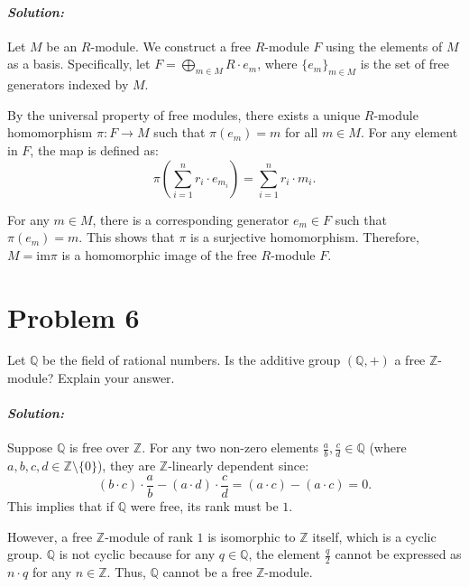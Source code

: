 \documentclass[12pt, a4paper]{article}
\newenvironment{solution}
  {\paragraph{\textit{Solution:}}\par\medskip}
  {\vspace{0.1cm}}
\begin{document}
\begin{solution}
    Let $M$ be an $R$-module. We construct a free $R$-module $F$ using the elements of $M$ as a basis. Specifically, let $F = \bigoplus_{m \in M} R \cdot e_m$, where $\{e_m\}_{m \in M}$ is the set of free generators indexed by $M$.

By the universal property of free modules, there exists a unique $R$-module homomorphism $\pi: F \to M$ such that $\pi(e_m) = m$ for all $m \in M$. For any element in $F$, the map is defined as:
\[ \pi\left( \sum_{i=1}^n r_i \cdot e_{m_i} \right) = \sum_{i=1}^n r_i \cdot m_i. \]

For any $m \in M$, there is a corresponding generator $e_m \in F$ such that $\pi(e_m) = m$. This shows that $\pi$ is a surjective homomorphism. Therefore, $M = \text{im} \pi$ is a homomorphic image of the free $R$-module $F$.
\end{solution}

\section*{Problem 6}
Let $\mathbb{Q}$ be the field of rational numbers. Is the additive group $(\mathbb{Q}, +)$ a free $\mathbb{Z}$-module? Explain your answer.

\begin{solution}
Suppose $\mathbb{Q}$ is free over $\mathbb{Z}$. For any two non-zero elements $\frac{a}{b}, \frac{c}{d} \in \mathbb{Q}$ (where $a, b, c, d \in \mathbb{Z} \setminus \{0\}$), they are $\mathbb{Z}$-linearly dependent since:
\[ (b \cdot c) \cdot \frac{a}{b} - (a \cdot d) \cdot \frac{c}{d} = (a \cdot c) - (a \cdot c) = 0. \]
This implies that if $\mathbb{Q}$ were free, its rank must be $1$. 

However, a free $\mathbb{Z}$-module of rank $1$ is isomorphic to $\mathbb{Z}$ itself, which is a cyclic group. $\mathbb{Q}$ is not cyclic because for any $q \in \mathbb{Q}$, the element $\frac{q}{2}$ cannot be expressed as $n \cdot q$ for any $n \in \mathbb{Z}$. Thus, $\mathbb{Q}$ cannot be a free $\mathbb{Z}$-module.
\end{solution}
\end{document}
